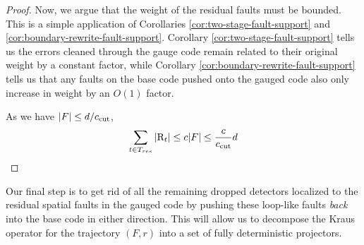 \documentclass[11pt]{article}
\begin{document}
\begin{proof}
    Now, we argue that the weight of the residual faults must be bounded. This is a simple application of Corollaries \ref{cor:two-stage-fault-support} and \ref{cor:boundary-rewrite-fault-support}. Corollary \ref{cor:two-stage-fault-support} tells us the errors cleaned through the gauge code remain related to their original weight by a constant factor, while Corollary \ref{cor:boundary-rewrite-fault-support} tells us that any faults on the base code pushed onto the gauged code also only increase in weight by an $O(1)$ factor. 

    As we have $|F| \leq d/c_{\rm cut}$, 
    \begin{equation}
        \sum_{t \in T_{res}} |\mathrm{R}_t| \leq c |F| \leq \frac{c}{c_{\rm cut}} d
    \end{equation}

    
    \end{proof}

Our final step is to get rid of all the remaining dropped detectors localized to the residual spatial faults in the gauged code by pushing these loop-like faults \emph{back} into the base code in either direction. This will allow us to decompose the Kraus operator for the trajectory $(F, r)$ into a set of fully deterministic projectors.
\end{document}
